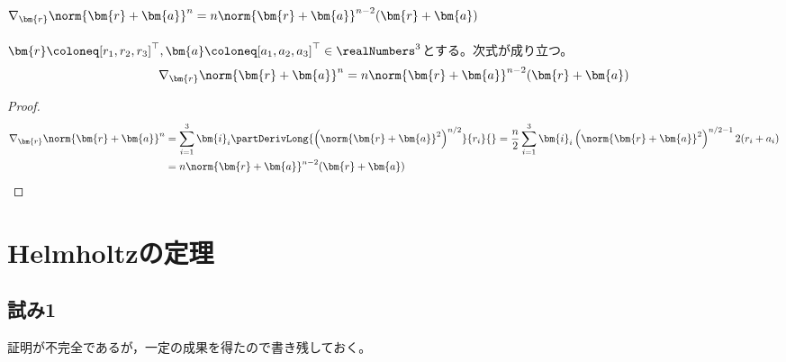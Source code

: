         \subsection{\texorpdfstring{$\nabla_\bm{r}\norm{\bm{r}+\bm{a}}^n = n\norm{\bm{r}+\bm{a}}^{n-2}(\bm{r}+\bm{a})$}{距離のn乗の勾配}}
            \begin{shadebox}
                $\bm{r} \coloneq [r_1,r_2,r_3]^\top,\bm{a} \coloneq [a_1,a_2,a_3]^\top\in\realNumbers^3$とする。次式が成り立つ。
                \[ \nabla_\bm{r}\norm{\bm{r}+\bm{a}}^n = n\norm{\bm{r}+\bm{a}}^{n-2}(\bm{r}+\bm{a}) \]
            \end{shadebox}
            \begin{proof}
                \begin{align*}
                    \nabla_\bm{r}\norm{\bm{r}+\bm{a}}^n &= \sum_{i=1}^3 \bm{i}_i \partDerivLong{\left(\norm{\bm{r}+\bm{a}}^2\right)^{n/2}}{r_i}{} = \frac{n}{2} \sum_{i=1}^3 \bm{i}_i \left(\norm{\bm{r}+\bm{a}}^2\right)^{n/2-1} 2(r_i+a_i) \\
                    &= n\norm{\bm{r}+\bm{a}}^{n-2}(\bm{r}+\bm{a})
                \end{align*}
            \end{proof}
    \section{Helmholtzの定理}
        \subsection{試み1}
            証明が不完全であるが，一定の成果を得たので書き残しておく。
